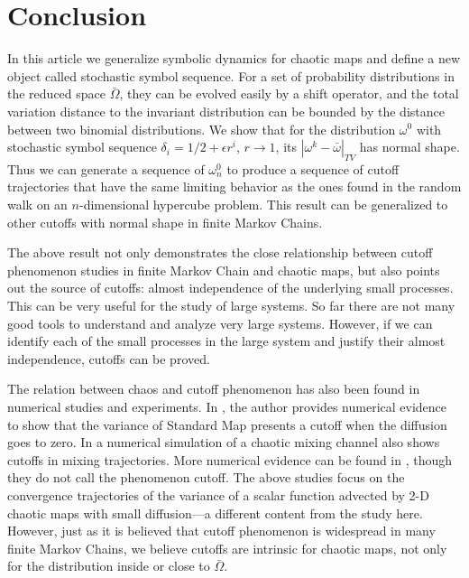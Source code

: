 %
%
\section{Conclusion}
\label{sec:symdynconclusion}
In this article we generalize symbolic dynamics for chaotic maps and define a new object called
stochastic symbol sequence. For a set of probability distributions in the reduced space
$\bar{\Omega}$, they can be evolved easily by a shift operator, and the total variation distance to
the invariant distribution can be bounded by the distance between two binomial distributions. We
show that for the distribution $\omega^0$ with stochastic symbol sequence $\delta_i=1/2+\epsilon
r^i$, $r \to 1$, its $|\omega^k-\bar{\omega}|_{TV}$ has normal shape. Thus we can generate
a sequence of $\omega^0_n$ to produce a sequence of cutoff trajectories that have the same
limiting behavior as the ones found in the random walk on an $n$-dimensional hypercube problem. This
result can be generalized to other cutoffs with normal shape in finite Markov Chains.

The above result not only demonstrates the close relationship between cutoff phenomenon studies in finite Markov Chain and chaotic maps, but also points out the source of cutoffs: almost independence of the underlying small processes. This can be very useful for the study of large systems. So far there are not many good tools to understand and analyze very large systems. However, if we can identify each of the small processes in the large system and justify their almost independence, cutoffs can be proved. 

The relation between chaos and cutoff phenomenon has also been found in numerical studies and
experiments. In \cite{numcutoff}, the author provides numerical evidence to show that the
variance of Standard Map presents a cutoff when the diffusion goes to zero. In \cite{topopt} a
numerical simulation of a chaotic mixing channel also shows cutoffs in mixing trajectories. More
numerical evidence can be found in \cite{Thiffeault2003-13, Tsang2005}, though they do not call
the phenomenon cutoff. The above studies focus on the convergence trajectories of the variance of a
scalar function advected by 2-D chaotic maps with small diffusion---a different content from the study here. However, just as it is believed that cutoff phenomenon is widespread in many
finite Markov Chains, we believe cutoffs are intrinsic for chaotic maps, not only for the
distribution inside or close to $\bar{\Omega}$.
